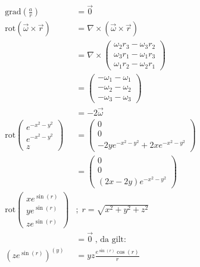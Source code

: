 \documentclass[12pt,a4paper,notitlepage]{article}
\newcommand{\grad}{\text{grad}}
\newcommand{\rot}{\text{rot}}
\begin{document}
\begin{align}
\grad\left(\frac{a}{r}\right)&=\vec 0\\
\rot(\vec\omega\times\vec r)&=\nabla\times(\vec\omega\times\vec r)\\
&=\nabla\times\left(\begin{matrix}
\omega_2r_3-\omega_3r_2\\
\omega_3r_1-\omega_1r_3\\
\omega_1r_2-\omega_2r_1
\end{matrix}\right)\\
&=\left(\begin{matrix}
-\omega_1-\omega_1\\
-\omega_2-\omega_2\\
-\omega_3-\omega_3
\end{matrix}\right)\\
&=-2\vec\omega\\
\rot\left(\begin{matrix}
e^{-x^2-y^2}\\
e^{-x^2-y^2}\\
z
\end{matrix}\right)&=\left(\begin{matrix}
0\\
0\\
-2ye^{-x^2-y^2}+2xe^{-x^2-y^2}
\end{matrix}\right)\\
&=\left(\begin{matrix}
0\\
0\\
(2x-2y)e^{-x^2-y^2}
\end{matrix}\right)\\
\rot\left(\begin{matrix}
xe^{\sin(r)}\\
ye^{\sin(r)}\\
ze^{\sin(r)}
\end{matrix}\right)&;\;r=\sqrt{x^2+y^2+z^2}\\
&=\vec 0\;\text{, da gilt: }\\
\left(ze^{\sin(r)}\right)^{(y)}&=yz\frac{e^{\sin(r)}\cos(r)}{r}
\end{align}
\end{document}
